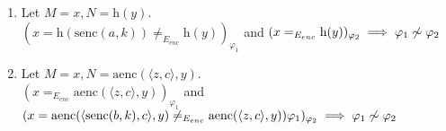 \begin{enumerate}
    \item Let $M = x, N = \mathrm{h}(y)$. \\
        $(x = \mathrm{h}(\mathrm{senc}(a, k)) \neq_{E_{enc}} \mathrm{h}(y))_{\varphi_1}$
        and
        $(x =_{E_{enc}} \mathrm{h}(y))_{\varphi_2}
        \implies \varphi_1 \centernot\sim \varphi_2$
    \item Let $M = x, N = \mathrm{aenc}(\langle z, c \rangle, y)$. \\
        $(x =_{E_{enc}} \mathrm{aenc}(\langle z, c \rangle, y))_{\varphi_1}$
        and
        $(x = \mathrm{aenc}(\langle \mathrm{senc}(b, k), c \rangle, y) \neq_{E_{enc}} \mathrm{aenc}(\langle z, c \rangle, y))\varphi_1)_{\varphi_2} \\
        \implies \varphi_1 \centernot\sim \varphi_2$
\end{enumerate}
